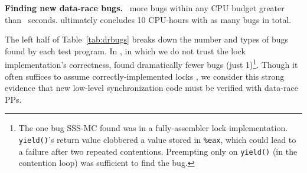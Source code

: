 {\bf Finding new data-race bugs.}
~more bugs within any CPU budget greater than ~seconds.
 ultimately concludes 10 CPU-hours with  as many bugs in total.


The left half of Table~\ref{tab:drbugs}
breaks down the number and types of bugs found by each test program.
In \mxtest, in which we do not trust the lock implementation's correctness,
found dramatically fewer bugs (just 1)\footnote{
	The one bug SSS-MC found was in a fully-assembler lock implementation. {\tt yield()}'s return value clobbered a value stored in {\tt \%eax}, which could lead to a failure after two repeated contentions. Preempting only on {\tt yield()} (in the contention loop) was sufficient to find the bug.}.
Though it often suffices to assume correctly-implemented locks \cite{dbug-thesis},
we consider this strong evidence that new low-level synchronization code must be verified with data-race PPs.

